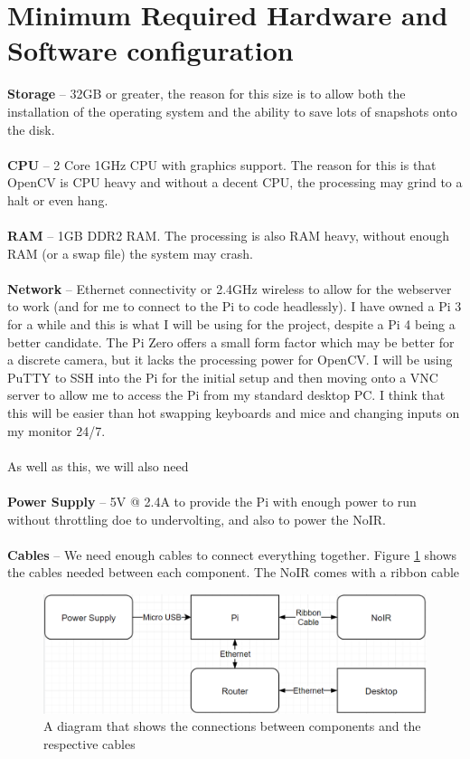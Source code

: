\documentclass[9pt]{article}
\begin{document}
\section{Minimum Required Hardware and Software configuration}\label{sec_hardware}
\textbf{Storage} -- 32GB or greater, the reason for this size is to allow both the installation of the operating system and the ability to save lots of snapshots onto the disk.\\\\
\textbf{CPU} -- 2 Core 1GHz CPU with graphics support. The reason for this is that OpenCV is CPU heavy and without a decent CPU, the processing may grind to a halt or even hang.\\\\
\textbf{RAM} -- 1GB DDR2 RAM. The processing is also RAM heavy, without enough RAM (or a swap file) the system may crash. \\\\
\textbf{Network} -- Ethernet connectivity or 2.4GHz wireless to allow for the webserver to work (and for me to connect to the Pi to code headlessly).
I have owned a Pi 3 for a while and this is what I will be using for the project, despite a Pi 4 being a better candidate. The Pi Zero offers a small form factor which may be better for a discrete camera, but it lacks the processing power for OpenCV. I will be using PuTTY to SSH into the Pi for the initial setup and then moving onto a VNC server to allow me to access the Pi from my standard desktop PC. I think that this will be easier than hot swapping keyboards and mice and changing inputs on my monitor 24/7. \\\\
As well as this, we will also need\\\\
\textbf{Power Supply} -- 5V @ 2.4A to provide the Pi with enough power to run without throttling doe to undervolting, and also to power the NoIR.\\\\
\textbf{Cables} -- We need enough cables to connect everything together. Figure \ref{fig_raspberryCables} shows the cables needed between each component. The NoIR comes with a ribbon cable
\begin{figure}[H]
	\centering
	\includegraphics[width=5in]{raspberryCables.png}
	\caption{A diagram that shows the connections between components and the respective cables}\label{fig_raspberryCables}
\end{figure}
\end{document}
